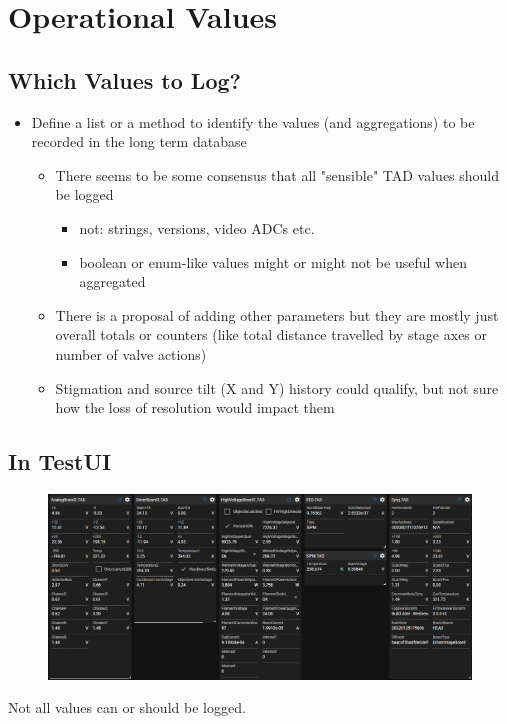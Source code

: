 \documentclass[t, 9pt, aspectratio=169]{beamer}
\begin{document}
    \section{Operational Values}
    \subsection{Which Values to Log?}
    
    \begin{frame}{\secname}{\subsecname}
        \begin{itemize}
            \item Define a list or a method to identify the values (and aggregations) to be recorded in the long term database
            \begin{itemize}
                \item There seems to be some consensus that all "sensible" TAD values should be logged
                \begin{itemize}
                    \item not: strings, versions, video ADCs etc.
                    \item boolean or enum-like values might or might not be useful when aggregated
                \end{itemize}
                \item There is a proposal of adding other parameters but they are mostly just overall totals or counters (like total distance travelled by stage axes or number of valve actions)
                \item Stigmation and source tilt (X and Y) history could qualify, but not sure how the loss of resolution would impact them
            \end{itemize}
        \end{itemize}
    \end{frame}

    \subsection{In TestUI}

    \begin{frame}{\secname}{\subsecname}
        \vspace*{-0.5cm}
        \begin{figure}
            \hspace*{-0.8cm}\includegraphics[scale=0.37]{tad-accessors-xl2.jpg}
        \end{figure}
        Not all values can or should be logged.
    \end{frame}
\end{document}
